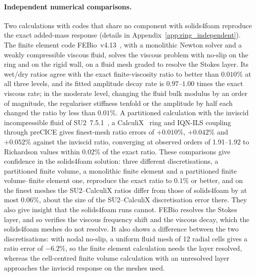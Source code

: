 \paragraph{Independent numerical comparisons.}
Two calculations with codes that share no component with solids4foam reproduce the exact added-mass response (details in Appendix~\ref{app:ring_independent}).
The finite element code FEBio~v4.13~\citep{Maas2012,Ateshian2018,Shim2019}, with a monolithic Newton solver and a weakly compressible viscous fluid, solves the viscous problem with no-slip on the ring and on the rigid wall, on a fluid mesh graded to resolve the Stokes layer.
Its wet/dry ratios agree with the exact finite-viscosity ratio to better than $0.010\%$ at all three levels, and its fitted amplitude decay rate is $0.97$--$1.00$ times the exact viscous rate; in the moderate level, changing the fluid bulk modulus by an order of magnitude, the regulariser stiffness tenfold or the amplitude by half each changed the ratio by less than $0.01\%$.
A partitioned calculation with the inviscid incompressible fluid of SU2~7.5.1~\citep{Economon2016,Economon2020}, a CalculiX~\citep{Dhondt2004} ring and IQN-ILS coupling through preCICE gives finest-mesh ratio errors of $+0.010\%$, $+0.042\%$ and $+0.052\%$ against the inviscid ratio, converging at observed orders of 1.91--1.92 to Richardson values within $0.02\%$ of the exact ratio.
These comparisons give confidence in the solids4foam solution: three different discretisations, a partitioned finite volume, a monolithic finite element and a partitioned finite volume--finite element one, reproduce the exact ratio to $0.1\%$ or better, and on the finest meshes the SU2--CalculiX ratios differ from those of solids4foam by at most $0.06\%$, about the size of the SU2--CalculiX discretisation error there.
They also give insight that the solids4foam runs cannot.
FEBio resolves the Stokes layer, and so verifies the viscous frequency shift and the viscous decay, which the solids4foam meshes do not resolve.
It also shows a difference between the two discretisations: with nodal no-slip, a uniform fluid mesh of 12 radial cells gives a ratio error of $-6.2\%$, so the finite element calculation needs the layer resolved, whereas the cell-centred finite volume calculation with an unresolved layer approaches the inviscid response on the meshes used.

